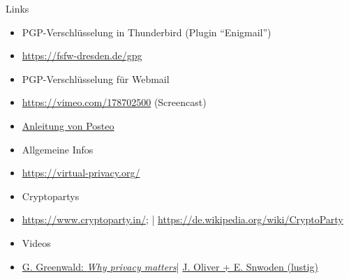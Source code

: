 \documentclass{beamer}
\begin{document}
\begin{frame}[label=lk1]{Links}
\begin{itemize}
\item[] \hspace{-2em} PGP-Verschlüsselung in Thunderbird (Plugin "`Enigmail"')
\item \url{https://fsfw-dresden.de/gpg}\\[4mm]
\item[] \hspace{-2em} PGP-Verschlüsselung für Webmail
\item \url{https://vimeo.com/178702500} (Screencast)\\[2mm]
\item \href{https://posteo.de/hilfe/wie-installiere-ich-eine-ende-zu-ende-verschluesselung-pgp-im-browser}{Anleitung von Posteo}
\item[] \hspace{-2em} Allgemeine Infos
\item \url{https://virtual-privacy.org/}
\item[] \hspace{-2em} Cryptopartys
\item {\tiny \url{https://www.cryptoparty.in/}; \quad | \quad \url{https://de.wikipedia.org/wiki/CryptoParty}}
\item[] \hspace{-2em} Videos
\item 
{\tiny \href{https://www.ted.com/talks/glenn_greenwald_why_privacy_matters}{G. Greenwald: \textit{Why privacy matters}}\quad | \quad
\href{https://www.youtube.com/watch?v=XEVlyP4_11M}{J. Oliver + E. Snwoden (lustig)}}
\end{itemize}
\end{frame}
\end{document}
